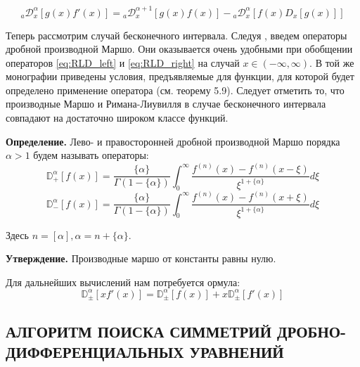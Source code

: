 \documentclass[a4paper, fontsize=14pt]{article}
\newcommand{\MD}[2]{\mathbb{D}_{#1}^{\alpha}[#2]} %
\newcommand{\RLD}[3]{{}_{#1}\mathcal{D}_{#2}^{\alpha} \left[#3\right]} %
\newcommand{\D}[3]{D_{#1}^{#2} \left[ #3 \right]} %
\newcommand{\RLDa}[4]{{}_{#1}\mathcal{D}_{#2}^{#4} \left[#3\right]} %
\begin{document}
\begin{equation}
  \RLD{a}{x}{g(x) f'(x)} = \RLDa{a}{x}{g(x) f(x)}{\alpha + 1} - \RLD{a}{x}{f(x) \D{x}{}{g(x)}}
\end{equation}

Теперь рассмотрим случай бесконечного интервала. Следуя \cite{samko}, введем операторы дробной производной Маршо.
Они оказывается очень удобными при обобщении операторов \eqref{eq:RLD_left} и \eqref{eq:RLD_right} на случай $x\in (-\infty, \infty)$.
В той же монографии приведены условия, предъявляемые для функции, для которой будет определено применение оператора (см. теорему 5.9).
Следует отметить то, что производные Маршо и Римана-Лиувилля в случае бесконечного интервала совпадают на достаточно широком классе функций.

\textbf{Определение.} Лево- и правосторонней дробной производной Маршо порядка $\alpha > 1$ будем называть операторы:
\begin{equation}
  \MD{+}{f(x)} = \frac{\{ \alpha \}}{\Gamma(1 - \{\alpha\})} \int_0^\infty\frac{f^{(n)}(x) - f^{(n)}(x-\xi)}{\xi^{1 + \{\alpha\}}} d\xi
\end{equation}
\begin{equation}
  \label{eq:MD_xux}
  \MD{-}{f(x)} = \frac{\{ \alpha \}}{\Gamma(1 - \{\alpha\})} \int_0^\infty\frac{f^{(n)}(x) - f^{(n)}(x+\xi)}{\xi^{1 + \{\alpha\}}} d\xi
\end{equation}

Здесь $n = [\alpha], \alpha = n + \{\alpha\}$.


\textbf{Утверждение.} Производные маршо от константы равны нулю.

Для дальнейших вычислений нам потребуется ормула:
\begin{equation}
  \MD{\pm}{x f'(x)} = \MD{\pm}{f(x)}  + x \MD{\pm}{f'(x)} 
\end{equation}


\subsection[Алгоритм поиска симметрий дробно-дифференциальных уравнений]{АЛГОРИТМ ПОИСКА СИММЕТРИЙ ДРОБНО-ДИФФЕРЕНЦИАЛЬНЫХ УРАВНЕНИЙ}
\end{document}
